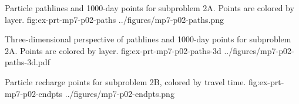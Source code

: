 \begin{StandardFigure}{
	Particle pathlines and 1000-day points for subproblem 2A. Points are colored by layer.
}
	{fig:ex-prt-mp7-p02-paths}
	{../figures/mp7-p02-paths.png}
\end{StandardFigure}

\begin{StandardFigure}{
	Three-dimensional perspective of pathlines and 1000-day points for subproblem 2A. Points are colored by layer.
}
	{fig:ex-prt-mp7-p02-paths-3d}
	{../figures/mp7-p02-paths-3d.pdf}
\end{StandardFigure}

\begin{StandardFigure}{
	Particle recharge points for subproblem 2B, colored by travel time.
}
	{fig:ex-prt-mp7-p02-endpts}
	{../figures/mp7-p02-endpts.png}
\end{StandardFigure}